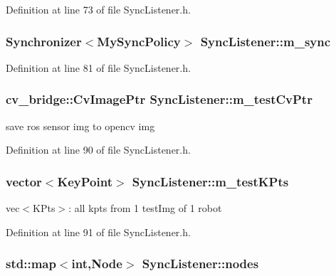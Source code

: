 \-Definition at line 73 of file \-Sync\-Listener.\-h.

\hypertarget{classSyncListener_a2f352324b76a40e4e7b6cb560f527b2c}{
\subsubsection[{m\-\_\-sync}]{\setlength{\rightskip}{0pt plus 5cm}\-Synchronizer$<${\bf \-My\-Sync\-Policy}$>$ {\bf \-Sync\-Listener\-::m\-\_\-sync}}}\label{classSyncListener_a2f352324b76a40e4e7b6cb560f527b2c}


\-Definition at line 81 of file \-Sync\-Listener.\-h.

\hypertarget{classSyncListener_a86ba5fc553e1a656b7643c09e865aebb}{
\subsubsection[{m\-\_\-test\-Cv\-Ptr}]{\setlength{\rightskip}{0pt plus 5cm}cv\-\_\-bridge\-::\-Cv\-Image\-Ptr {\bf \-Sync\-Listener\-::m\-\_\-test\-Cv\-Ptr}}}\label{classSyncListener_a86ba5fc553e1a656b7643c09e865aebb}


save ros sensor img to opencv img 



\-Definition at line 90 of file \-Sync\-Listener.\-h.

\hypertarget{classSyncListener_a6ebc46a18ad7a9acb1d00a7373959572}{
\subsubsection[{m\-\_\-test\-K\-Pts}]{\setlength{\rightskip}{0pt plus 5cm}vector$<$\-Key\-Point$>$ {\bf \-Sync\-Listener\-::m\-\_\-test\-K\-Pts}}}\label{classSyncListener_a6ebc46a18ad7a9acb1d00a7373959572}


vec$<$\-K\-Pts$>$\-: all kpts from 1 test\-Img of 1 robot 



\-Definition at line 91 of file \-Sync\-Listener.\-h.

\hypertarget{classSyncListener_a8f72710aa41f9f4b48c23ac1d5f37e23}{
\subsubsection[{nodes}]{\setlength{\rightskip}{0pt plus 5cm}std\-::map$<$int,{\bf \-Node}$>$ {\bf \-Sync\-Listener\-::nodes}}}\label{classSyncListener_a8f72710aa41f9f4b48c23ac1d5f37e23}


